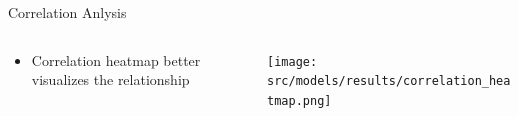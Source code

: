   \begin{frame}{Correlation Anlysis}
        \begin{columns}
        \begin{column}{0.5\textwidth}
        \begin{itemize}
            
            \item<1-> Correlation heatmap better visualizes the relationship
        \end{itemize}
        \end{column}
        \begin{column}{0.6\textwidth}  %
            \begin{center}
             \texttt{[image: src/models/results/correlation\_heatmap.png]}
             \end{center}
        \end{column}
        \end{columns}
    \end{frame}

